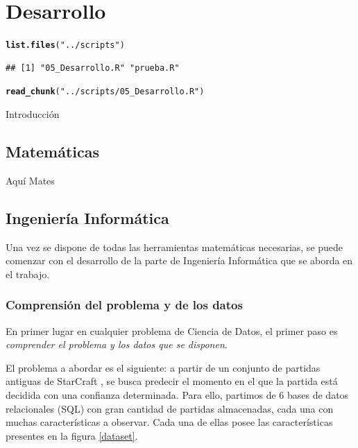 \documentclass[a4paper,11pt]{book}\usepackage[]{graphicx}\usepackage[]{color}
\makeatletter
\newcommand{\hlstr}[1]{\textcolor[rgb]{0.192,0.494,0.8}{#1}}%
\newcommand{\hlstd}[1]{\textcolor[rgb]{0.345,0.345,0.345}{#1}}%
\newcommand{\hlkwd}[1]{\textcolor[rgb]{0.737,0.353,0.396}{\textbf{#1}}}%
\newenvironment{kframe}{%
 \def\at@end@of@kframe{}%
 \ifinner\ifhmode%
  \def\at@end@of@kframe{\end{minipage}}%
  \begin{minipage}{\columnwidth}%
 \fi\fi%
 \def\FrameCommand##1{\hskip\@totalleftmargin \hskip-\fboxsep
 \colorbox{shadecolor}{##1}\hskip-\fboxsep
     \hskip-\linewidth \hskip-\@totalleftmargin \hskip\columnwidth}%
 \MakeFramed {\advance\hsize-\width
   \@totalleftmargin\z@ \linewidth\hsize
   \@setminipage}}%
 {\par\unskip\endMakeFramed%
 \at@end@of@kframe}
\newenvironment{knitrout}{}{} %
\makeatother
\begin{document}
\chapter{Desarrollo}

\begin{knitrout}
\color{fgcolor}\begin{kframe}
\begin{alltt}
\hlkwd{list.files}\hlstd{(}\hlstr{"../scripts"}\hlstd{)}
\end{alltt}
\begin{verbatim}
## [1] "05_Desarrollo.R" "prueba.R"
\end{verbatim}
\begin{alltt}
\hlkwd{read_chunk}\hlstd{(}\hlstr{"../scripts/05_Desarrollo.R"}\hlstd{)}
\end{alltt}
\end{kframe}
\end{knitrout}
Introducción

\section{Matemáticas}
Aquí Mates

\section{Ingeniería Informática}
Una vez se dispone de todas las herramientas matemáticas necesarias,
se puede comenzar con el desarrollo de la parte de Ingeniería Informática que
se aborda en el trabajo.

\subsection{Comprensión del problema y de los datos}

En primer lugar en cualquier problema de Ciencia de Datos, el primer
paso es \emph{comprender el problema y los datos que se disponen}.

El problema a abordar es el siguiente: a partir de un conjunto de
partidas antiguas de StarCraft \cite{dataset2014}, se busca predecir
el momento en el que la partida está decidida con una confianza
determinada. Para ello, partimos de 6 bases de datos relacionales
(SQL) con gran cantidad de partidas almacenadas, cada una con muchas
características a observar. Cada una de ellas posee las
características presentes en la figura \ref{dataset}.
\end{document}
